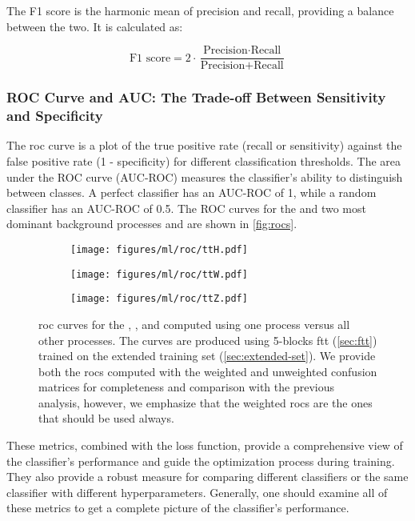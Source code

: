 The F1 score is the harmonic mean of precision and recall, providing a balance between the two. It is calculated as:

\begin{equation}
    \text{F1 score} = 2 \cdot \frac{\text{Precision} \cdot \text{Recall}}{\text{Precision} + \text{Recall}}
\end{equation}

\subsubsection{ROC Curve and AUC: The Trade-off Between Sensitivity and Specificity}

The \gls{roc} curve is a plot of the true positive rate (recall or sensitivity) against
the false positive rate (1 - specificity) for different classification thresholds. The area under the ROC curve
(AUC-ROC) measures the classifier's ability to distinguish between classes. A perfect classifier has an AUC-ROC of 1,
while a random classifier has an AUC-ROC of 0.5. The ROC curves for the \tth and two most dominant background processes
\ttw and \ttz are shown in \autoref{fig:rocs}.

\begin{figure}[htb]
    \centering
    \begin{subfigure}{0.32\textwidth}
        \texttt{[image: figures/ml/roc/ttH.pdf]}
        \caption{\tth}
        \label{fig:roc-tth}
    \end{subfigure}
    \begin{subfigure}{0.32\textwidth}
        \texttt{[image: figures/ml/roc/ttW.pdf]}
        \caption{\ttw}
        \label{fig:roc-ttw}
    \end{subfigure}
    \begin{subfigure}{0.32\textwidth}
        \texttt{[image: figures/ml/roc/ttZ.pdf]}
        \caption{\ttz}
        \label{fig:roc-ttz}
    \end{subfigure}
    \caption[\acrshort{roc} curves for \tth, \ttz, and \ttz]
    {\gls{roc} curves for the \tth, \ttw, and \ttz computed using one process versus all other processes. The curves are produced
        using 5-blocks \gls{ftt} (\autoref{sec:ftt}) trained on the extended training set (\autoref{sec:extended-set}).
        We provide both the \glspl{roc} computed with the weighted and unweighted confusion matrices for completeness
        and comparison with the previous analysis, however, we emphasize that the weighted \glspl{roc} are the ones that
        should be used always.}
    \label{fig:rocs}
\end{figure}


These metrics, combined with the loss function, provide a comprehensive view of the classifier's performance and guide
the optimization process during training. They also provide a robust measure for comparing different classifiers or the
same classifier with different hyperparameters. Generally, one should examine all of these metrics to get a complete
picture of the classifier's performance.